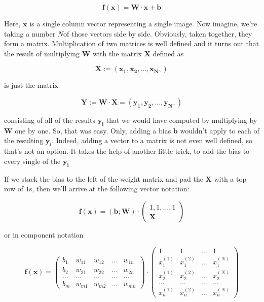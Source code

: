 \documentclass[]{report}
\begin{document}
\begin{equation}
\mathbf{f}(\mathbf{x})=\mathbf{W} \cdot \mathbf{x} + \mathbf{b}
\end{equation}

Here, \(\mathbf{x}\) is a single column vector representing a single image. Now imagine, we're taking a number \(N\)of those vectors side by side. Obviously, taken together, they form a matrix. Multiplication of two matrices is well defined and it turns out that the result of multiplying \(\mathbf{W}\) with the matrix \(\mathbf{X}\) defined as

\begin{equation}
	\mathbf{X} := (  \mathbf{x_1}, \mathbf{x_2}, \dots,  \mathbf{x_N}, )
\end{equation}

is just the matrix 

\begin{equation}
\mathbf{Y} := \mathbf{W} \cdot \mathbf{X} = (  \mathbf{y_1}, \mathbf{y_2}, \dots,  \mathbf{y_N}, )
\end{equation}

consisting of all of the results \(\mathbf{y_i}\) that we would have computed by multiplying by \(\mathbf{W}\) one by one. So, that was easy. Only, adding a bias \(\mathbf{b}\) wouldn't apply to each of the resulting \(\mathbf{y_i}\). Indeed, adding a vector to a matrix is not even well defined, so that's not an option. It takes the help of another little trick, to add the bias to every single of the \(\mathbf{y_i}\)

If we stack the bias to the left of the weight matrix and pad the \(\mathbf{X}\) with a top row of \(1\)s, then we'll arrive at the following vector notation:

\begin{equation} \label{parallel_affine}
\mathbf{f}(\mathbf{x})=(\mathbf{b};\mathbf{W}) \cdot \left( 
\begin{array}{c} 
1, 1, \dots, 1 \\
\mathbf{X} 
\end{array}
 \right)
\end{equation}

or in component notation 

\begin{equation}
\mathbf{f}(\mathbf{x})=
\left( 
\begin{array}{ccccc} 
b_1 & w_{11} & w_{12} & \dots &  w_{1n}
\\
b_2 & w_{21} & w_{22} & \dots &  w_{2n}
\\
\dots & \dots &\dots &\dots &\dots
\\
b_m & w_{m1} & w_{m2} & \dots &  w_{mn}
\end{array}
\right)
\cdot
\left( 
\begin{array}{cccc} 
1 & 1 & \dots & 1
\\
x_1^{(1)}& x_1^{(2)}& \dots & x_1^{(N)}
\\
x_2^{(1)}& x_2^{(2)}& \dots & x_2^{(N)}
\\
\dots &\dots &\dots &\dots
\\
x_n^{(1)}& x_n^{(2)}& \dots & x_n^{(N)}
\end{array}
\right)
\end{equation}
\end{document}
